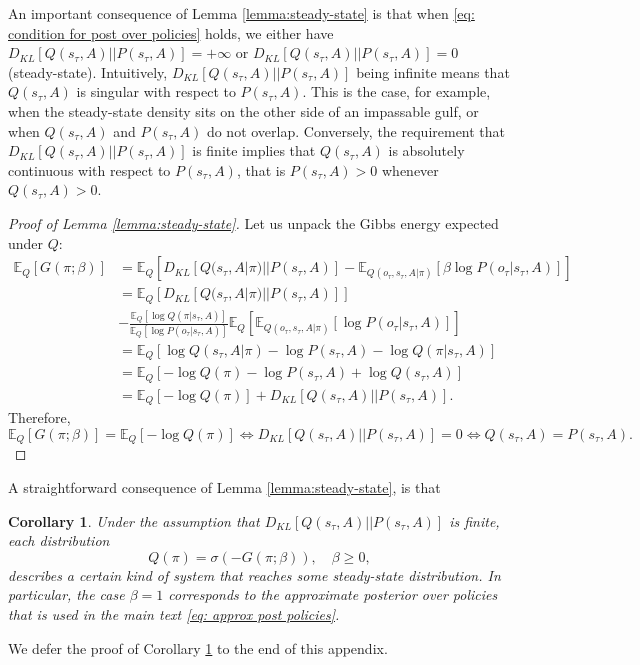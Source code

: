 \documentclass[review,12pt,authoryear]{elsarticle}
\newtheorem{corollary}[theorem]{Corollary}
\begin{document}
An important consequence of Lemma \ref{lemma:steady-state} is that when \eqref{eq: condition for post over policies} holds, we either have $D_{KL}[Q(s_\tau, A) ||P(s_\tau, A)]=+\infty$ or $D_{KL}[Q(s_\tau, A) ||P(s_\tau, A)]=0$ (steady-state). Intuitively, $D_{KL}[Q(s_\tau, A) ||P(s_\tau, A)]$ being infinite means that $Q(s_\tau, A)$ is singular with respect to $P(s_\tau, A)$. This is the case, for example, when the steady-state density sits on the other side of an impassable gulf, or when $Q(s_\tau, A)$ and $P(s_\tau, A)$ do not overlap. Conversely, the requirement that $D_{KL}[Q(s_\tau, A) ||P(s_\tau, A)]$ is finite implies that $Q(s_\tau, A)$ is absolutely continuous with respect to $P(s_\tau, A)$, that is $P(s_\tau, A)>0$ whenever $Q(s_\tau, A)>0$.

\begin{proof}[Proof of Lemma \ref{lemma:steady-state}]
Let us unpack the Gibbs energy expected under $Q$:
\begin{equation*}
    \begin{split}
        \mathbb E_Q[G(\pi; \beta)] &=\mathbb E_Q[D_{KL}[Q(s_\tau, A|\pi)||P(s_\tau,A)]-\mathbb E_{Q(o_\tau, s_\tau, A|\pi)} [\beta \log P(o_\tau |s_\tau, A)]] \\
        &= \mathbb E_Q[D_{KL}[Q(s_\tau, A|\pi)||P(s_\tau,A)]]\\
        &-\frac{\mathbb E_Q[\log Q(\pi|s_\tau,A)]}{\mathbb E_Q[\log P(o_\tau|s_\tau,A)]} \mathbb E_Q [\mathbb E_{Q(o_\tau, s_\tau, A|\pi)} [ \log P(o_\tau |s_\tau, A)]] \\
        &= \mathbb E_Q[\log Q(s_\tau, A|\pi)-\log P(s_\tau, A)-\log Q(\pi |s_\tau,A)] \\
        &= \mathbb E_Q[-\log Q(\pi)-\log P(s_\tau, A)+\log Q(s_\tau,A)] \\
        &= \mathbb E_Q[-\log Q(\pi)] +D_{KL}[Q(s_\tau,A)||P(s_\tau, A)].
    \end{split}
\end{equation*}
Therefore,
\begin{equation*}
    \mathbb E_Q[G(\pi; \beta)] = \mathbb E_Q[-\log Q(\pi)] \iff D_{KL}[Q(s_\tau,A)||P(s_\tau, A)]=0 \iff Q(s_\tau,A)=P(s_\tau, A).
\end{equation*}
\end{proof}

A straightforward consequence of Lemma \ref{lemma:steady-state}, is that
\begin{corollary}
\label{cor: posterior over policies}
Under the assumption that $D_{KL}[Q(s_\tau, A) ||P(s_\tau, A)]$ is finite, each distribution
\begin{equation}
    \label{eq:posterior_gibbs}
   Q(\pi) =\sigma(-G(\pi; \beta)),\quad \beta \geq 0,
\end{equation}
describes a certain kind of system that reaches some steady-state distribution. In particular, the case $\beta =1$ corresponds to the approximate posterior over policies that is used in the main text \eqref{eq: approx post policies}.
\end{corollary}
We defer the proof of Corollary \ref{cor: posterior over policies} to the end of this appendix.
\end{document}
